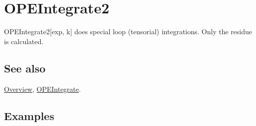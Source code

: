 \documentclass[../FeynCalcManual.tex]{subfiles}
\begin{document}
\hypertarget{opeintegrate2}{
\section{OPEIntegrate2}\label{opeintegrate2}}

OPEIntegrate2{[}exp, k{]} does special loop (tensorial) integrations.
Only the residue is calculated.

\subsection{See also}

\hyperlink{toc}{Overview}, \hyperlink{opeintegrate}{OPEIntegrate}.

\subsection{Examples}
\end{document}
